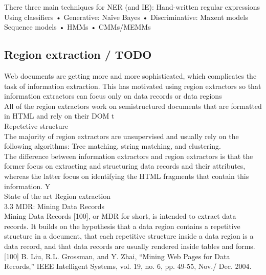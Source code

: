 There three main techniques for NER (and IE): 
\te
Hand-written regular expressions\\
Using classifiers
• Generative: Naïve Bayes
• Discriminative: Maxent models\\
Sequence models
• HMMs
• CMMs/MEMMs\\


\subsection{Region extraction / TODO}

\cite{RegExtrSurvey}

Web documents are getting more and more sophisticated,
which complicates the task of information extraction. This
has motivated using region extractors so that information
extractors can focus only on data records or data regions\\

All of the region extractors work on semistructured
documents that are formatted in HTML and rely on
their DOM t\\
Repetetive structure\\
The majority of region extractors are unsupervised
and usually rely on the following algorithms: Tree
matching, string matching, and clustering.\\

 The difference
between information extractors and region extractors is that
the former focus on extracting and structuring data records
and their attributes, whereas the latter focus on identifying
the HTML fragments that contain this information. Y \\

State of the art Region extraction\\
3.3 MDR: Mining Data Records\\
Mining Data Records [100], or MDR for short, is intended to
extract data records. It builds on the hypothesis that a data
region contains a repetitive structure in a document, that
each repetitive structure inside a data region is a data
record, and that data records are usually rendered inside
tables and forms.\\
\cite{LiuMinData} [100] B. Liu, R.L. Grossman, and Y. Zhai, “Mining Web Pages for Data
Records,” IEEE Intelligent Systems, vol. 19, no. 6, pp. 49-55, Nov./
Dec. 2004.\\

